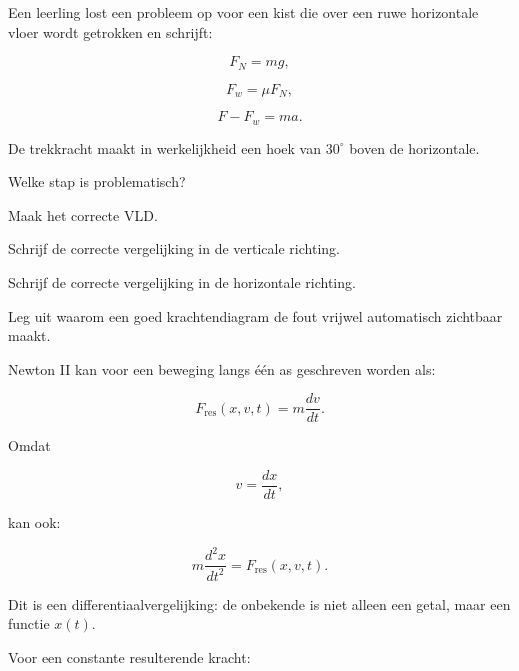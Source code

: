 \documentclass{ximera}
\begin{document}
\begin{oefening}[Foutenanalyse]{\oefU\ESS}

Een leerling lost een probleem op voor een kist die over een ruwe
horizontale vloer wordt getrokken en schrijft:

\[
F_N=mg,
\]

\[
F_w=\mu F_N,
\]

\[
F-F_w=ma.
\]

De trekkracht maakt in werkelijkheid een hoek van $30^\circ$ boven de
horizontale.

\begin{question}
Welke stap is problematisch?
\end{question}

\begin{question}
Maak het correcte VLD.
\end{question}

\begin{question}
Schrijf de correcte vergelijking in de verticale richting.
\end{question}

\begin{question}
Schrijf de correcte vergelijking in de horizontale richting.
\end{question}

\begin{question}
Leg uit waarom een goed krachtendiagram de fout vrijwel automatisch
zichtbaar maakt.
\end{question}

\end{oefening}




Newton II kan voor een beweging langs één as geschreven worden als:

\[
F_{\mathrm{res}}(x,v,t)
=
m\frac{dv}{dt}.
\]

Omdat

\[
v=\frac{dx}{dt},
\]

kan ook:

\[
\boxed{
m\frac{d^2x}{dt^2}
=
F_{\mathrm{res}}(x,v,t).
}
\]

Dit is een differentiaalvergelijking: de onbekende is niet alleen een
getal, maar een functie $x(t)$.

Voor een constante resulterende kracht:
\end{document}

